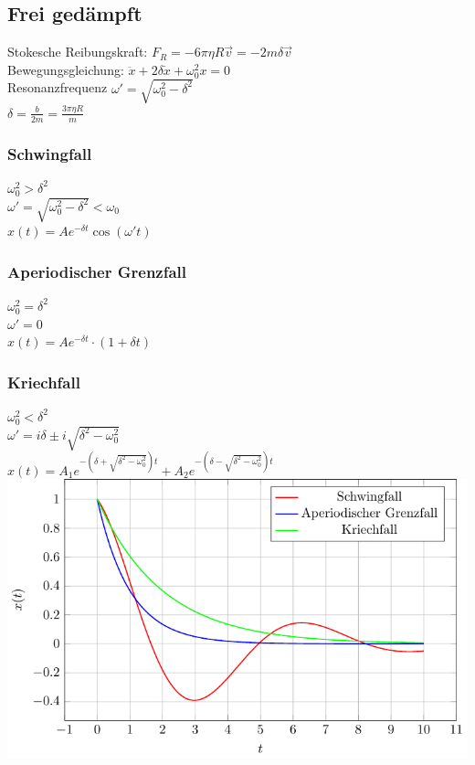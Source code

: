 \documentclass[german]{latex4ei/latex4ei_sheet}
\begin{document}
\subsection{Frei gedämpft}
Stokesche Reibungskraft: $F_R=-6 \pi \eta R \vec{v}=-2m\delta\vec{v}$\\
Bewegungsgleichung: $\ddot{x}+2\delta \dot{x}+\omega_0^2x=0$\\
 Resonanzfrequenz $\omega'=\sqrt{\omega_0^2-\delta^2}$ \\
 $\delta = \frac{b}{2m}=\frac{3\pi \eta R}{m}$\\
 
\begin{sectionbox}
\subsubsection{Schwingfall}
$\omega_0^2>\delta^2$\\
$\omega'=\sqrt{\omega_0^2-\delta^2}<\omega_0$\\
$x(t)=Ae^{-\delta t}\cos(\omega't)$
\subsubsection{Aperiodischer Grenzfall}
$\omega_0^2=\delta^2$\\
$\omega'=0$\\
$x(t)=Ae^{-\delta t}\cdot (1+\delta t)$
\subsubsection{Kriechfall}
$\omega_0^2<\delta^2$\\
$\omega'=i\delta \pm i\sqrt{\delta^2-\omega_0^2}$\\
$x(t)=A_1e^{-(\delta+\sqrt{\delta^2-\omega_0^2})t}+A_2e^{-(\delta - \sqrt{\delta^2-\omega_0^2})t}$\\

\includegraphics[width=.9\columnwidth]{img/Schwingungen.pdf}
\end{sectionbox}
\end{document}
